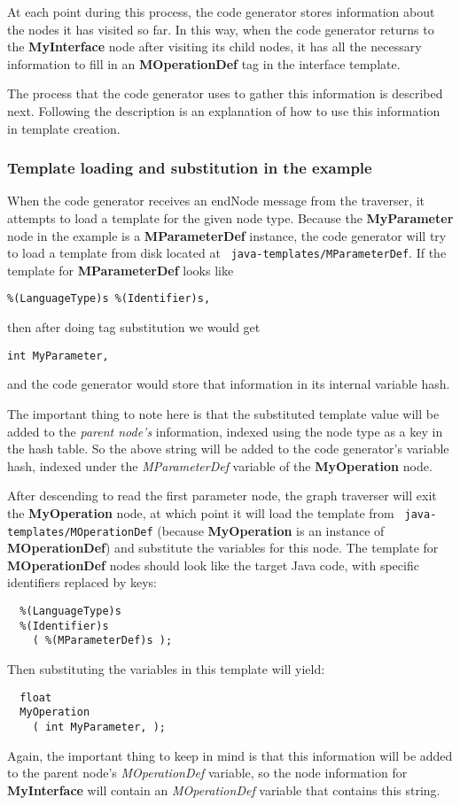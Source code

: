At each point during this process, the code generator stores information about
the nodes it has visited so far. In this way, when the code generator returns to
the {\bf MyInterface} node after visiting its child nodes, it has all the
necessary information to fill in an {\bf MOperationDef} tag in the interface
template.

The process that the code generator uses to gather this information is described
next. Following the description is an explanation of how to use this information
in template creation.

\subsubsection{Template loading and substitution in the example}

When the code generator receives an endNode message from the traverser, it
attempts to load a template for the given node type. Because the {\bf
MyParameter} node in the example is a {\bf MParameterDef} instance, the code
generator will try to load a template from disk located at {\tt
java-templates/MParameterDef}. If the template for {\bf MParameterDef} looks
like
\begin{verbatim}
%(LanguageType)s %(Identifier)s,
\end{verbatim}
then after doing tag substitution we would get
\begin{verbatim}
int MyParameter,
\end{verbatim}
and the code generator would store that information in its internal variable
hash.

The important thing to note here is that the substituted template value will be
added to the {\em parent node's\/} information, indexed using the node type as a
key in the hash table. So the above string will be added to the code generator's
variable hash, indexed under the {\it MParameterDef\/} variable of the {\bf
MyOperation} node.

After descending to read the first parameter node, the graph traverser will exit
the {\bf MyOperation} node, at which point it will load the template from {\tt
java-templates/MOperationDef} (because {\bf MyOperation} is an instance of {\bf
MOperationDef}) and substitute the variables for this node. The template for
{\bf MOperationDef} nodes should look like the target Java code, with specific
identifiers replaced by keys:
\begin{verbatim}
  %(LanguageType)s
  %(Identifier)s
    ( %(MParameterDef)s );
\end{verbatim}
Then substituting the variables in this template will yield:
\begin{verbatim}
  float
  MyOperation
    ( int MyParameter, );
\end{verbatim}
Again, the important thing to keep in mind is that this information will be
added to the parent node's {\it MOperationDef\/} variable, so the node
information for {\bf MyInterface} will contain an {\it MOperationDef\/} variable
that contains this string.

